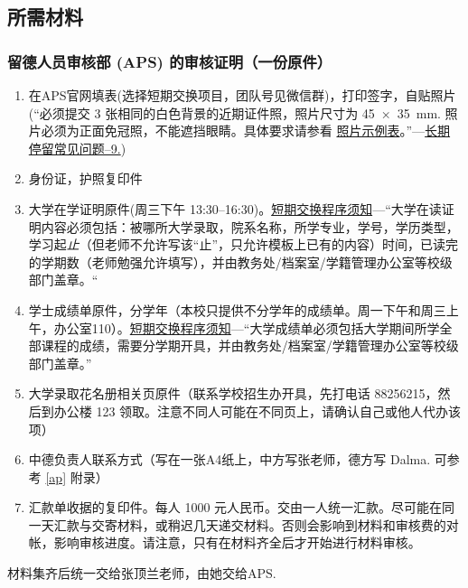 \documentclass{article}
\begin{document}
\subsection{所需材料}
\subsubsection{留德人员审核部 (APS) 的审核证明（一份原件）}
\begin{enumerate}
  \item 在APS官网填表(选择短期交换项目，团队号见微信群)，打印签字，自贴照片(“必须提交 3 张相同的白色背景的近期证件照，照片尺寸为 \SI{45x35}{\mm}. 照片必须为正面免冠照，不能遮挡眼睛。具体要求请参看 \href{https://china.diplo.de/blob/1090226/8b25f160e56c0465aa9b5d5d19f89c4f/pdf-fotomustertafel-data.pdf}{照片示例表}。”---\href{https://china.diplo.de/cn-zh/service/visa-einreise/faq-national-visa/1434978}{长期停留常见问题--9.})
  \item 身份证，护照复印件
  \item 大学在学证明原件(周三下午 13:30--16:30)。\href{https://www.aps.org.cn/wp-content/uploads/260_merkblatt_verfahren_austausch_chn.pdf}{短期交换程序须知}---“大学在读证明内容必须包括：被哪所大学录取，院系名称，所学专业，学号，学历类型，学习起\emph{止}（但老师不允许写该“止”，只允许模板上已有的内容）时间，已读完的学期数（老师勉强允许填写），并由教务处/档案室/学籍管理办公室等校级部门盖章。“
  \item 学士成绩单原件，分学年（本校只提供不分学年的成绩单。周一下午和周三上午，办公室110）。\href{https://www.aps.org.cn/wp-content/uploads/260_merkblatt_verfahren_austausch_chn.pdf}{短期交换程序须知}---“大学成绩单必须包括大学期间所学全部课程的成绩，需要分学期开具，并由教务处/档案室/学籍管理办公室等校级部门盖章。”
  \item 大学录取花名册相关页原件（联系学校招生办开具，先打电话 88256215，然后到办公楼 123 领取。注意不同人可能在不同页上，请确认自己或他人代办该项）
  \item 中德负责人联系方式（写在一张A4纸上，中方写张老师，德方写 Dalma. 可参考 \ref{ap} 附录）
  \item 汇款单收据的复印件。每人 1000 元人民币。交由一人统一汇款。尽可能在同一天汇款与交寄材料，或稍迟几天递交材料。否则会影响到材料和审核费的对帐，影响审核进度。请注意，只有在材料齐全后才开始进行材料审核。
\end{enumerate}
材料集齐后统一交给张顶兰老师，由她交给APS.
\end{document}
